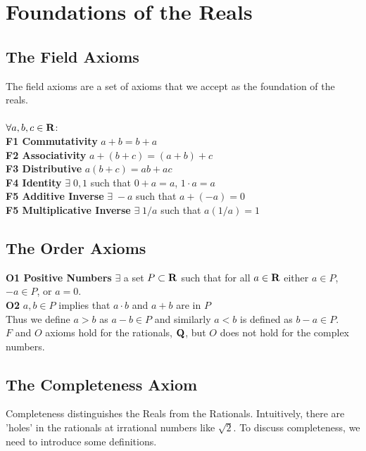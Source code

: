 \section{Foundations of the Reals}
  \subsection{The Field Axioms}
    The field axioms are a set of axioms that we accept as the foundation of the reals.\\\\
    $\forall a,b,c \in \mathbf{R}$:\\

    \textbf{F1 Commutativity}   $a+b = b+a$\\
    \textbf{F2 Associativity}  $a+(b +c) = (a+b)+c$\\
    \textbf{F3 Distributive}  $a(b +c) = ab+ac$\\
    \textbf{F4 Identity}  $\exists\;0,1$ such that $0 + a = a$, $1 \cdot a = a$ \\
    \textbf{F5 Additive Inverse}  $\exists\;-a$ such that $a + (-a) = 0$\\
    \textbf{F5 Multiplicative Inverse}  $\exists\;1/a$ such that $a(1/a) = 1$
  \subsection{The Order Axioms}
    \textbf{O1 Positive Numbers} $\exists$ a set $P \subset \mathbf {\mathbf{R}}$ such that for all 
    $a \in \mathbf{R}$ either $a \in P$, $-a \in P$, or $a = 0$.\\
    \textbf{O2} $a,b \in P$ implies that $a\cdot b$ and $a + b$ are in $P$\\

    Thus we define $a > b$ as $a - b \in P$ and similarly $a < b$ is defined as $b - a \in P$.\\

    $F$ and $O$ axioms hold for the rationals, $\mathbf{Q}$, but $O$ does not hold for the 
    complex numbers.
  \subsection{The Completeness Axiom}
    Completeness distinguishes the Reals from the Rationals. Intuitively, there are 'holes' in 
    the rationals at irrational numbers like $\sqrt{2}$. To discuss completeness, we need to 
    introduce some definitions.\\


